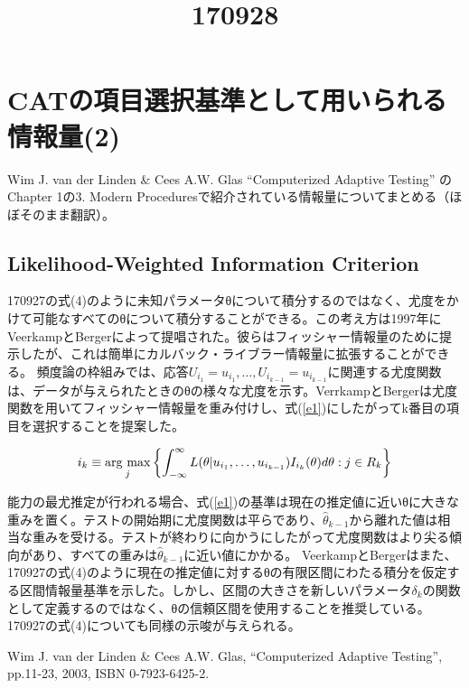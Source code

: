 \documentclass[a4j]{jarticle}
\date{}
\title{170928}
\begin{document}
\maketitle

\section{CATの項目選択基準として用いられる情報量(2)}
Wim J. van der Linden \& Cees A.W. Glas ``Computerized Adaptive Testing'' \cite{b1}のChapter 1の3. Modern Proceduresで紹介されている情報量についてまとめる（ほぼそのまま翻訳）。

\subsection{Likelihood-Weighted Information Criterion}
170927の式(4)のように未知パラメータθについて積分するのではなく、尤度をかけて可能なすべてのθについて積分することができる。この考え方は1997年にVeerkampとBergerによって提唱された。彼らはフィッシャー情報量のために提示したが、これは簡単にカルバック・ライブラー情報量に拡張することができる。
頻度論の枠組みでは、応答$U_{i_{1}}=u_{i_{1}},\ldots,U_{i_{k-1}}=u_{i_{k-1}}$に関連する尤度関数は、データが与えられたときのθの様々な尤度を示す。VerrkampとBergerは尤度関数を用いてフィッシャー情報量を重み付けし、式(\ref{e1})にしたがってk番目の項目を選択することを提案した。

\newcommand{\argmax}{\mathop{\rm arg~max}\limits}
\begin{eqnarray}
  \label{e1}
  i_{k} \equiv \argmax_{j}\left\{\int_{-\infty}^{\infty}L(\theta|u_{i_{1}},\ldots,u_{i_{k-1}})I_{i_{k}}(\theta)d\theta:j\in R_{k}\right\}
\end{eqnarray}

能力の最尤推定が行われる場合、式(\ref{e1})の基準は現在の推定値に近いθに大きな重みを置く。テストの開始期に尤度関数は平らであり、$\hat{\theta}_{k-1}$から離れた値は相当な重みを受ける。テストが終わりに向かうにしたがって尤度関数はより尖る傾向があり、すべての重みは$\hat{\theta}_{k-1}$に近い値にかかる。
VeerkampとBergerはまた、170927の式(4)のように現在の推定値に対するθの有限区間にわたる積分を仮定する区間情報量基準を示した。しかし、区間の大きさを新しいパラメータ$\delta_{k}$の関数として定義するのではなく、θの信頼区間を使用することを推奨している。170927の式(4)についても同様の示唆が与えられる。

\begin{thebibliography}{9}
   Wim J. van der Linden \& Cees A.W. Glas, ``Computerized Adaptive Testing'', pp.11-23, 2003, ISBN 0-7923-6425-2.
\end{thebibliography}
\end{document}
